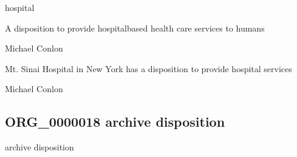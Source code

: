 \documentclass[letterpaper,10pt,english]{sphinxmanual}
\begin{document}
\begin{sphinxShadowBox}

\sphinxAtStartPar
hospital
\end{sphinxShadowBox}

\begin{sphinxShadowBox}

\sphinxAtStartPar
{\hyperref[\detokenize{doc-BFO_0000016::doc}]{}}
\end{sphinxShadowBox}

\begin{sphinxShadowBox}

\sphinxAtStartPar
A disposition to provide hospital\sphinxhyphen{}based health care services to humans
\end{sphinxShadowBox}

\begin{sphinxShadowBox}

\sphinxAtStartPar
Michael Conlon 
\end{sphinxShadowBox}

\begin{sphinxShadowBox}

\sphinxAtStartPar
Mt. Sinai Hospital in New York has a disposition to provide hospital services
\end{sphinxShadowBox}

\begin{sphinxShadowBox}

\sphinxAtStartPar
Michael Conlon 
\end{sphinxShadowBox}
\begin{quote}

\ignorespaces \end{quote}


\subsection{ORG\_0000018 \sphinxhyphen{} archive disposition}
\label{\detokenize{doc-ORG_0000018:org-0000018-archive-disposition}}\label{\detokenize{doc-ORG_0000018:index-0}}\label{\detokenize{doc-ORG_0000018::doc}}
\begin{sphinxShadowBox}

\sphinxAtStartPar
archive disposition
\end{sphinxShadowBox}
\end{document}
